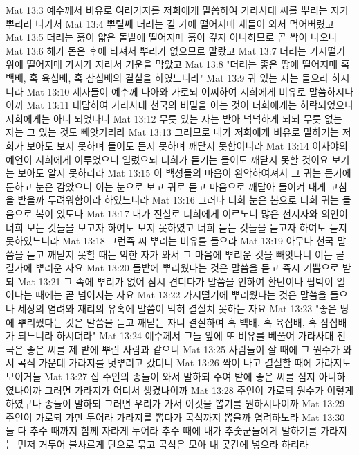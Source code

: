 Mat 13:3  예수께서 비유로 여러가지를 저희에게 말씀하여 가라사대 씨를 뿌리는 자가 뿌리러 나가서
Mat 13:4  뿌릴쌔 더러는 길 가에 떨어지매 새들이 와서 먹어버렸고
Mat 13:5  더러는 흙이 얇은 돌밭에 떨어지매 흙이 깊지 아니하므로 곧 싹이 나오나
Mat 13:6  해가 돋은 후에 타져서 뿌리가 없으므로 말랐고
Mat 13:7  더러는 가시떨기 위에 떨어지매 가시가 자라서 기운을 막았고
Mat 13:8  "더러는 좋은 땅에 떨어지매 혹 백배, 혹 육십배, 혹 삼십배의 결실을 하였느니라"
Mat 13:9  귀 있는 자는 들으라 하시니라
Mat 13:10  제자들이 예수께 나아와 가로되 어찌하여 저희에게 비유로 말씀하시나이까
Mat 13:11  대답하여 가라사대 천국의 비밀을 아는 것이 너희에게는 허락되었으나 저희에게는 아니 되었나니
Mat 13:12  무릇 있는 자는 받아 넉넉하게 되되 무릇 없는 자는 그 있는 것도 빼앗기리라
Mat 13:13  그러므로 내가 저희에게 비유로 말하기는 저희가 보아도 보지 못하며 들어도 듣지 못하며 깨닫지 못함이니라
Mat 13:14  이사야의 예언이 저희에게 이루었으니 일렀으되 너희가 듣기는 들어도 깨닫지 못할 것이요 보기는 보아도 알지 못하리라
Mat 13:15  이 백성들의 마음이 완악하여져서 그 귀는 듣기에 둔하고 눈은 감았으니 이는 눈으로 보고 귀로 듣고 마음으로 깨달아 돌이켜 내게 고침을 받을까 두려워함이라 하였느니라
Mat 13:16  그러나 너희 눈은 봄으로 너희 귀는 들음으로 복이 있도다
Mat 13:17  내가 진실로 너희에게 이르노니 많은 선지자와 의인이 너희 보는 것들을 보고자 하여도 보지 못하였고 너희 듣는 것들을 듣고자 하여도 듣지 못하였느니라
Mat 13:18  그런즉 씨 뿌리는 비유를 들으라
Mat 13:19  아무나 천국 말씀을 듣고 깨닫지 못할 때는 악한 자가 와서 그 마음에 뿌리운 것을 빼앗나니 이는 곧 길가에 뿌리운 자요
Mat 13:20  돌밭에 뿌리웠다는 것은 말씀을 듣고 즉시 기쁨으로 받되
Mat 13:21  그 속에 뿌리가 없어 잠시 견디다가 말씀을 인하여 환난이나 핍박이 일어나는 때에는 곧 넘어지는 자요
Mat 13:22  가시떨기에 뿌리웠다는 것은 말씀을 들으나 세상의 염려와 재리의 유혹에 말씀이 막혀 결실치 못하는 자요
Mat 13:23  "좋은 땅에 뿌리웠다는 것은 말씀을 듣고 깨닫는 자니 결실하여 혹 백배, 혹 육십배, 혹 삼십배가 되느니라 하시더라"
Mat 13:24  예수께서 그들 앞에 또 비유를 베풀어 가라사대 천국은 좋은 씨를 제 밭에 뿌린 사람과 같으니
Mat 13:25  사람들이 잘 때에 그 원수가 와서 곡식 가운데 가라지를 덧뿌리고 갔더니
Mat 13:26  싹이 나고 결실할 때에 가라지도 보이거늘
Mat 13:27  집 주인의 종들이 와서 말하되 주여 밭에 좋은 씨를 심지 아니하였나이까 그러면 가라지가 어디서 생겼나이까
Mat 13:28  주인이 가로되 원수가 이렇게 하였구나 종들이 말하되 그러면 우리가 가서 이것을 뽑기를 원하시나이까
Mat 13:29  주인이 가로되 가만 두어라 가라지를 뽑다가 곡식까지 뽑을까 염려하노라
Mat 13:30  둘 다 추수 때까지 함께 자라게 두어라 추수 때에 내가 추숫군들에게 말하기를 가라지는 먼저 거두어 불사르게 단으로 묶고 곡식은 모아 내 곳간에 넣으라 하리라
